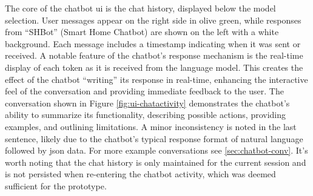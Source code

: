 The core of the chatbot \gls{ui} is the chat history, displayed below the model selection. User messages appear on the right side in olive green, while responses from ``SHBot'' (Smart Home Chatbot) are shown on the left with a white background. Each message includes a timestamp indicating when it was sent or received.
A notable feature of the chatbot's response mechanism is the real-time display of each token as it is received from the language model. This creates the effect of the chatbot ``writing'' its response in real-time, enhancing the interactive feel of the conversation and providing immediate feedback to the user.
The conversation shown in Figure \ref{fig:ui-chatactivity} demonstrates the chatbot's ability to summarize its functionality, describing possible actions, providing examples, and outlining limitations. A minor inconsistency is noted in the last sentence, likely due to the chatbot's typical response format of natural language followed by \gls{json} data. For more example conversations see \cref{sec:chatbot-conv}.
It's worth noting that the chat history is only maintained for the current session and is not persisted when re-entering the chatbot activity, which was deemed sufficient for the prototype.

